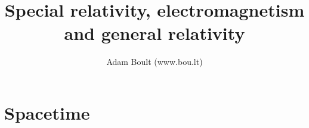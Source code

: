 \documentclass[oneside]{book}
\begin{document}
\author{Adam Boult (www.bou.lt)}
\title{Special relativity, electromagnetism and general relativity}
\maketitle

\setcounter{tocdepth}{0}
\tableofcontents



\part{Spacetime}

\end{document}
